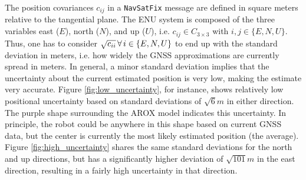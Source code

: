 \documentclass[english, master, utf8]{base/thesis_KBS}
\newcommand{\code}[1]{\colorbox{light-gray}{\texttt{#1}}}
\begin{document}
\noindent
The position covariances $c_{ij}$ in a \code{NavSatFix} message are defined in square meters relative to the tangential plane.
The ENU system is composed of the three variables east ($E$), north ($N$), and up ($U$), i.e. $c_{ij} \in C_{3 \times 3}$ with $i, j \in \{E, N, U\}$.
Thus, one has to consider $\sqrt{c_{ii}} \thinspace \forall \thinspace i \in \{E, N, U\}$ to end up with the standard deviation in meters, i.e. how widely the GNSS approximations are
currently spread in meters. In general, a minor standard deviation implies that the uncertainty about the current estimated position is very low, making the estimate very accurate.
Figure \ref{fig:low_uncertainty}, for instance, shows relatively low positional uncertainty based on standard deviations of $\sqrt{6}m$ in either direction. The purple shape
surrounding the AROX model indicates this uncertainty. In principle, the robot could be anywhere in this shape based on current GNSS data, but the center is currently the most likely
estimated position (the average). Figure \ref{fig:high_uncertainty} shares the same standard deviations for the north and up directions, but has a significantly higher deviation of
$\sqrt{101}m$ in the east direction, resulting in a fairly high uncertainty in that direction.
\end{document}
